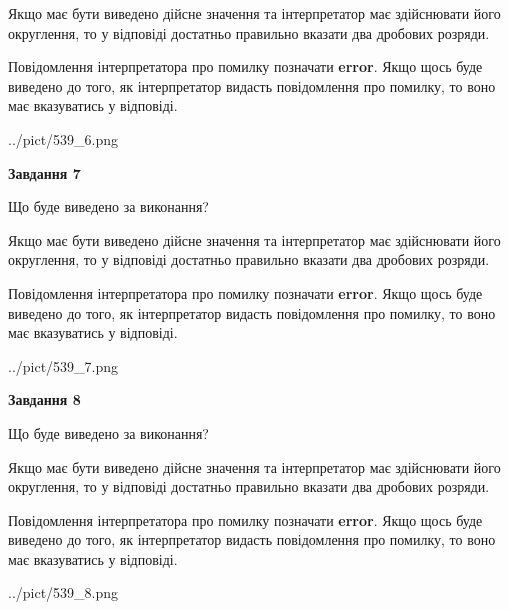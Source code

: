 \documentclass[12pt, ukrainian]{article}
\begin{document}
{\begin {Large}
Якщо має бути виведено дійсне значення та інтерпретатор має здійснювати його округлення, 
то у відповіді достатньо правильно вказати два дробових розряди.

Повідомлення інтерпретатора про помилку позначати \textbf{error}.
Якщо щось буде виведено до того, як інтерпретатор видасть повідомлення про помилку, 
то воно має вказуватись у відповіді. \par

\begin{center}
	{../pict/539_6.png}
\end{center}
\newpage

{\begin {center}\textbf{Завдання 7}\end {center}}\par
Що буде виведено за виконання? \par

Якщо має бути виведено дійсне значення та інтерпретатор має здійснювати його округлення, 
то у відповіді достатньо правильно вказати два дробових розряди.

Повідомлення інтерпретатора про помилку позначати \textbf{error}.
Якщо щось буде виведено до того, як інтерпретатор видасть повідомлення про помилку, 
то воно має вказуватись у відповіді. \par

\begin{center}
	{../pict/539_7.png}
\end{center}
\newpage

{\begin {center}\textbf{Завдання 8}\end {center}}\par
Що буде виведено за виконання? \par

Якщо має бути виведено дійсне значення та інтерпретатор має здійснювати його округлення, 
то у відповіді достатньо правильно вказати два дробових розряди.

Повідомлення інтерпретатора про помилку позначати \textbf{error}.
Якщо щось буде виведено до того, як інтерпретатор видасть повідомлення про помилку, 
то воно має вказуватись у відповіді. \par

\begin{center}
	{../pict/539_8.png}
\end{center}
\newpage


\end{Large}}
\end{document}
